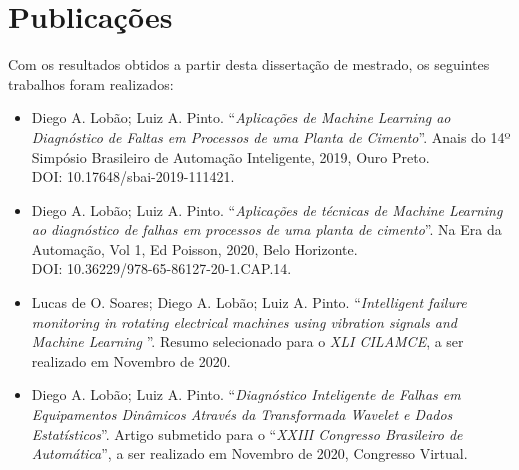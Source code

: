 \chapter{Publicações}

Com os resultados obtidos a partir desta dissertação de mestrado, os seguintes trabalhos foram realizados:
\begin{itemize}
    \item Diego A. Lobão; Luiz A. Pinto. ``\textit{Aplicações de Machine Learning ao Diagnóstico de Faltas em Processos de uma Planta de Cimento}''. Anais do 14º Simpósio Brasileiro de Automação Inteligente, 2019, Ouro Preto. \\ DOI: 10.17648/sbai-2019-111421.
    
    \item   Diego A. Lobão; Luiz A. Pinto. ``\textit{Aplicações de técnicas de Machine Learning ao diagnóstico de falhas em processos de uma planta de cimento}''. Na Era da Automação, Vol 1, Ed Poisson, 2020, Belo Horizonte. \\ DOI: 10.36229/978-65-86127-20-1.CAP.14.
    
    \item Lucas de O. Soares; Diego A. Lobão; Luiz A. Pinto. ``\textit{Intelligent failure monitoring in rotating electrical machines using vibration signals and Machine Learning }''. Resumo selecionado para o \textit{XLI CILAMCE}, a ser realizado em Novembro de 2020.
    
    \item  Diego A. Lobão; Luiz A. Pinto. ``\textit{Diagnóstico Inteligente de Falhas em Equipamentos Dinâmicos Através da Transformada Wavelet e Dados Estatísticos}''. Artigo submetido para o ``\textit{XXIII Congresso Brasileiro de Automática}'', a ser realizado em Novembro de 2020, Congresso Virtual.
\end{itemize}
